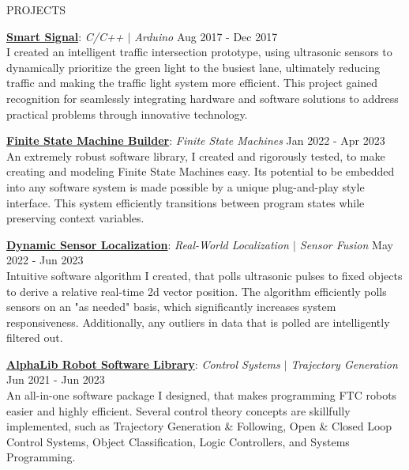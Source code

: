 \documentclass{resume} %
\begin{document}
\begin{rSection}{PROJECTS}
\vspace{-1.25em}
\item{\underline{\textbf{Smart Signal}}}: \textit{C/C++ $\vert$ Arduino} \hfill {Aug 2017 - Dec 2017} \vspace{0.25em} \\
{I created an intelligent traffic intersection prototype, using ultrasonic sensors to dynamically prioritize the green light to the busiest lane, ultimately reducing traffic and making the traffic light system more efficient. This project gained recognition for seamlessly integrating hardware and software solutions to address practical problems through innovative technology.}

\item{\underline{\textbf{Finite State Machine Builder}}}: \textit{Finite State Machines} \hfill {Jan 2022 - Apr 2023} \vspace{0.25em} \\
{An extremely robust software library, I created and rigorously tested, to make creating and modeling Finite State Machines easy. Its potential to be embedded into any software system is made possible by a unique plug-and-play style interface. This system efficiently transitions between program states while preserving context variables.}

\item{\underline{\textbf{Dynamic Sensor Localization}}}: \textit{Real-World Localization $\vert$ Sensor Fusion} \hfill {May 2022 - Jun 2023} \vspace{0.25em}\\
{Intuitive software algorithm I created, that polls ultrasonic pulses to fixed objects to derive a relative real-time 2d vector position. The algorithm efficiently polls sensors on an "as needed" basis, which significantly increases system responsiveness. Additionally, any outliers in data that is polled are intelligently filtered out.}

\item{\underline{\textbf{AlphaLib Robot Software Library}}}: \textit{Control Systems $\vert$ Trajectory Generation} \hfill {Jun 2021 - Jun 2023} \vspace{0.25em}\\
{An all-in-one software package I designed, that makes programming FTC robots easier and highly efficient. Several control theory concepts are skillfully implemented, such as Trajectory Generation \& Following, Open \& Closed Loop Control Systems, Object Classification, Logic Controllers, and Systems Programming.}
\end{rSection} 
\end{document}
